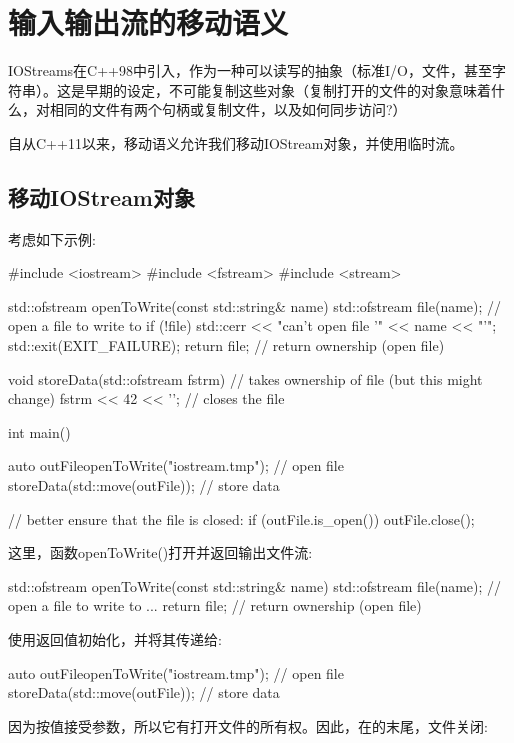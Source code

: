 \section{输入输出流的移动语义}
IOStreams在C++98中引入，作为一种可以读写的抽象（标准I/O，文件，甚至字符串）。这是早期的设定，不可能复制这些对象（复制打开的文件的对象意味着什么，对相同的文件有两个句柄或复制文件，以及如何同步访问?）

自从C++11以来，移动语义允许我们移动IOStream对象，并使用临时流。

\subsection{移动IOStream对象}

考虑如下示例:

\begin{cppcode}
#include <iostream>
#include <fstream>
#include <stream>

std::ofstream openToWrite(const std::string& name)
{
	std::ofstream file(name); // open a file to write to
	if (!file) {
		std::cerr << "can't open file '" << name << "'\n";
		std::exit(EXIT_FAILURE);
	}
	return file; // return ownership (open file)
}

void storeData(std::ofstream fstrm) // takes ownership of file (but this might change)
{
	fstrm << 42 << '\n';
} // closes the file

int main()
{
	auto outFile{openToWrite("iostream.tmp")}; // open file
	storeData(std::move(outFile)); // store data

	// better ensure that the file is closed:
	if (outFile.is_open()) {
		outFile.close();
	}
}
\end{cppcode}

这里，函数openToWrite()打开并返回输出文件流:

\begin{cppcode}
std::ofstream openToWrite(const std::string& name)
{
	std::ofstream file(name); // open a file to write to
	...
	return file; // return ownership (open file)
}
\end{cppcode}

使用返回值初始化，并将其传递给:

\begin{cppcode}
auto outFile{openToWrite("iostream.tmp")}; // open file
storeData(std::move(outFile)); // store data
\end{cppcode}

因为按值接受参数，所以它有打开文件的所有权。因此，在的末尾，文件关闭:

